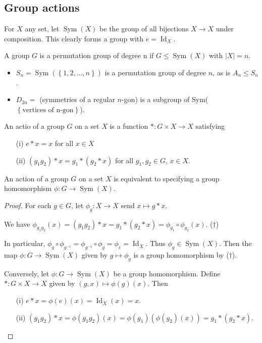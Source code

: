 \documentclass[a4paper]{scrartcl}
\begin{document}
\subsection{Group actions}
\begin{definition*}
      For $X$ any set, let $\operatorname{Sym}(X)$ be the group of all bijections $X \rightarrow X$ under composition. This clearly forms a group with $e=\operatorname{Id}_X$.

      A group $G$ is a permutation group of degree n if $G \leq \operatorname{Sym}(X)$ with $|X|=n$. 
\end{definition*}
\begin{example*}\hfill
      \begin{itemize}
           \item $S_{n}=\operatorname{Sym}(\left\{1,2,\ldots ,n\right\})$ is a permutation group of degree $n$, as is $A_{n}\leq S_{n}$.
           \item $D_{2n}=$ (symmetries of a regular $n$-gon) is a subgroup of Sym($\left\{\text{vertices of n-gon}\right\}$).
      \end{itemize}
\end{example*}
\begin{definition*}
      An actio of a group $G$ on a set $X$ is a function $\ast: G \times X \rightarrow X$ satisfying 
      \begin{itemize}
           \item[(i)] $e \ast x =x $ for all $x \in X$ 
           \item[(ii)] $(g_1 g_2 )\ast x= g_1 \ast (g_2 \ast x)$ for all $g_1 ,g_2 \in G$, $x \in X$.
      \end{itemize}
\end{definition*}
\begin{proposition}
     An action of a group $G$ on a set $X$ is equivalent to specifying a group homomorphism $\phi: G \rightarrow \operatorname{Sym}(X)$.
\end{proposition}
\begin{proof}
      For each $g \in G$, let $\phi_{g}: X \rightarrow X$ send $x \mapsto g \ast x$. 

      We have $\phi_{g_1 g_2 }(x)=(g_1 g_2 )\ast x=g_1 \ast (g_2 \ast x)=\phi_{g_1 }\circ \phi_{g_2 }(x)$. ($\dagger$)

      In particular, $\phi_{g}\circ \phi_{{g}^{-1}}=\phi_{{g}^{-1}}\circ \phi_{g}=\phi_{e}=\operatorname{Id}_X$. Thus $\phi_{g} \in \operatorname{Sym}(X)$. Then the map $\phi: G \rightarrow \operatorname{Sym}(X)$ given by $g \mapsto \phi_{g}$ is a group homomorphism by ($\dagger$).

      Conversely, let $\phi: G \rightarrow \operatorname{Sym}(X)$ be a group homomorphism. Define $\ast: G \times X \rightarrow X$ given by $(g,x) \mapsto \phi (g)(x)$. Then
      \begin{itemize}
           \item[(i)] $e \ast x=\phi (e)(x)=\operatorname{Id}_X (x)=x$.
           \item[(ii)] $(g_1 g_2 )\ast x= \phi (g_1 g_2 )(x)=\phi (g_1 )(\phi (g_2)(x))=g_1 \ast (g_2 \ast x)$. 
      \end{itemize}
\end{proof}
\end{document}
